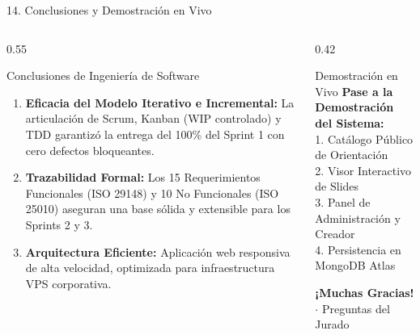 \documentclass[aspectratio=169, 10pt, spanish]{beamer}
\begin{document}
\begin{frame}{14. Conclusiones y Demostración en Vivo}
\begin{columns}[T]
    \begin{column}{0.55\textwidth}
        \begin{academicbox}{Conclusiones de Ingeniería de Software}
            \scriptsize
            \begin{enumerate}
                \item \textbf{Eficacia del Modelo Iterativo e Incremental:} La articulación de Scrum, Kanban (WIP controlado) y TDD garantizó la entrega del 100\% del Sprint 1 con cero defectos bloqueantes.
                \item \textbf{Trazabilidad Formal:} Los 15 Requerimientos Funcionales (ISO 29148) y 10 No Funcionales (ISO 25010) aseguran una base sólida y extensible para los Sprints 2 y 3.
                \item \textbf{Arquitectura Eficiente:} Aplicación web responsiva de alta velocidad, optimizada para infraestructura VPS corporativa.
            \end{enumerate}
        \end{academicbox}
    \end{column}
    \begin{column}{0.42\textwidth}
        \centering
        \vspace{2mm}
        \begin{formalbox}{Demostración en Vivo}
            \centering \scriptsize
            \textbf{Pase a la Demostración del Sistema:}\\
            \vspace{2mm}
            {\tiny
            1. Catálogo Público de Orientación\\
            2. Visor Interactivo de Slides\\
            3. Panel de Administración y Creador\\
            4. Persistencia en MongoDB Atlas
            }
        \end{formalbox}
        \vspace{3mm}
        {\tiny \textbf{¡Muchas Gracias!} $\cdot$ Preguntas del Jurado}
    \end{column}
\end{columns}
\end{frame}
\end{document}
